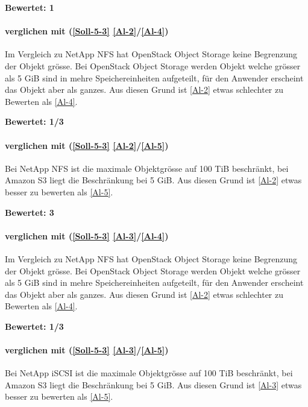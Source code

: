 \textbf{Bewertet: 1}

\paragraph*{  verglichen mit  (\ref{Soll-5-3} \ref{Al-2}/\ref{Al-4})}
Im Vergleich zu NetApp NFS hat OpenStack Object Storage keine Begrenzung der Objekt grösse. Bei OpenStack Object Storage werden Objekt welche grösser als 5 GiB sind in mehre Speichereinheiten aufgeteilt, für den Anwender erscheint das Objekt aber als ganzes. Aus diesen Grund ist  \ref{Al-2} etwas schlechter zu Bewerten als  \ref{Al-4}.

\textbf{Bewertet: 1/3}

\paragraph*{  verglichen mit  (\ref{Soll-5-3} \ref{Al-2}/\ref{Al-5})}
Bei NetApp NFS ist die maximale Objektgrösse auf 100 TiB beschränkt, bei Amazon S3 liegt die Beschränkung bei 5 GiB. Aus diesen Grund ist  \ref{Al-2} etwas besser zu bewerten als  \ref{Al-5}.

\textbf{Bewertet: 3}

\paragraph*{  verglichen mit  (\ref{Soll-5-3} \ref{Al-3}/\ref{Al-4})}
Im Vergleich zu NetApp NFS hat OpenStack Object Storage keine Begrenzung der Objekt grösse. Bei OpenStack Object Storage werden Objekt welche grösser als 5 GiB sind in mehre Speichereinheiten aufgeteilt, für den Anwender erscheint das Objekt aber als ganzes. Aus diesen Grund ist  \ref{Al-2} etwas schlechter zu Bewerten als  \ref{Al-4}.

\textbf{Bewertet: 1/3}

\paragraph*{  verglichen mit  (\ref{Soll-5-3} \ref{Al-3}/\ref{Al-5})}
Bei NetApp iSCSI ist die maximale Objektgrösse auf 100 TiB beschränkt, bei Amazon S3 liegt die Beschränkung bei 5 GiB. Aus diesen Grund ist  \ref{Al-3} etwas besser zu bewerten als  \ref{Al-5}.

